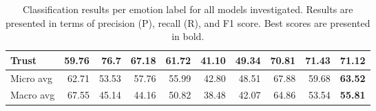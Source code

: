 \documentclass[11pt,a4paper]{article}
\begin{document}
\begin{table*}[]
\begin{tabular}{|l|rrr|rrr|rrr|}
Trust                               & 59.76                 & 76.7                  & 67.18                   & 61.72                 & 41.10                  & 49.34                   & 70.81                 & 71.43                 & {\bf 71.12}                   \\ \hline
Micro avg                           & 62.71                 & 53.53                 & 57.76                   & 55.99                 & 42.80                  & 48.51                   & 67.88                 & 59.68                 & {\bf 63.52}                   \\
Macro avg                           & 67.55                 & 45.14                 & 44.16                   & 50.82                 & 38.48                 & 42.07                   & 64.86                 & 53.54                 & {\bf 55.81}                   \\ \hline
\end{tabular}
\caption{Classification results per emotion label for all models investigated. Results are presented in terms of precision (P), recall (R), and F1 score.  Best scores are presented in bold.}
\label{table:results}
\end{table*}







\end{document}
